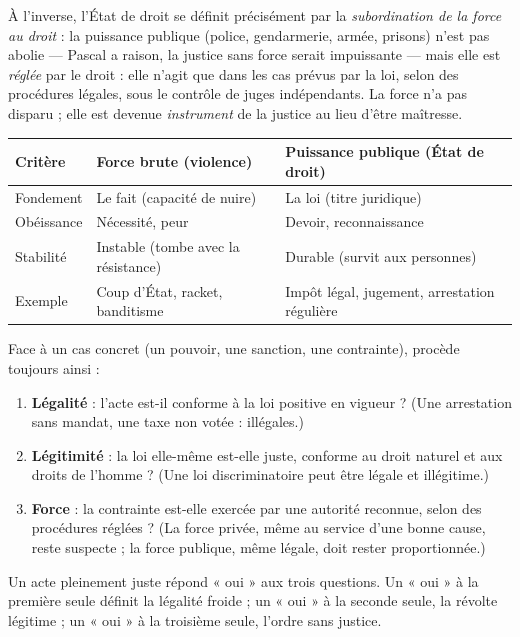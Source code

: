 \documentclass[11pt]{article}
\newcommand{\cle}[1]{{\popxbold\color{popdark}#1}}
\begin{document}
À l'inverse, l'\cle{État de droit} se définit précisément par la \emph{subordination de la force au droit} : la puissance publique (police, gendarmerie, armée, prisons) n'est pas abolie — Pascal a raison, la justice sans force serait impuissante — mais elle est \emph{réglée} par le droit : elle n'agit que dans les cas prévus par la loi, selon des procédures légales, sous le contrôle de juges indépendants. La force n'a pas disparu ; elle est devenue \emph{instrument} de la justice au lieu d'être maîtresse.

\begin{center}
\begin{tabularx}{\linewidth}{|l|X|X|}
\hline
\rowcolor{popblueL} \textbf{Critère} & \textbf{Force brute (violence)} & \textbf{Puissance publique (État de droit)} \\
\hline
Fondement & Le fait (capacité de nuire) & La loi (titre juridique) \\
\hline
Obéissance & Nécessité, peur & Devoir, reconnaissance \\
\hline
Stabilité & Instable (tombe avec la résistance) & Durable (survit aux personnes) \\
\hline
Exemple & Coup d'État, racket, banditisme & Impôt légal, jugement, arrestation régulière \\
\hline
\end{tabularx}
\end{center}

\begin{methode}
Face à un cas concret (un pouvoir, une sanction, une contrainte), procède toujours ainsi :
\begin{enumerate}
\item \textbf{Légalité} : l'acte est-il conforme à la loi positive en vigueur ? (Une arrestation sans mandat, une taxe non votée : illégales.)
\item \textbf{Légitimité} : la loi elle-même est-elle juste, conforme au droit naturel et aux droits de l'homme ? (Une loi discriminatoire peut être légale et illégitime.)
\item \textbf{Force} : la contrainte est-elle exercée par une autorité reconnue, selon des procédures réglées ? (La force privée, même au service d'une bonne cause, reste suspecte ; la force publique, même légale, doit rester proportionnée.)
\end{enumerate}
Un acte pleinement juste répond « oui » aux trois questions. Un « oui » à la première seule définit la légalité froide ; un « oui » à la seconde seule, la révolte légitime ; un « oui » à la troisième seule, l'ordre sans justice.
\end{methode}
\end{document}
